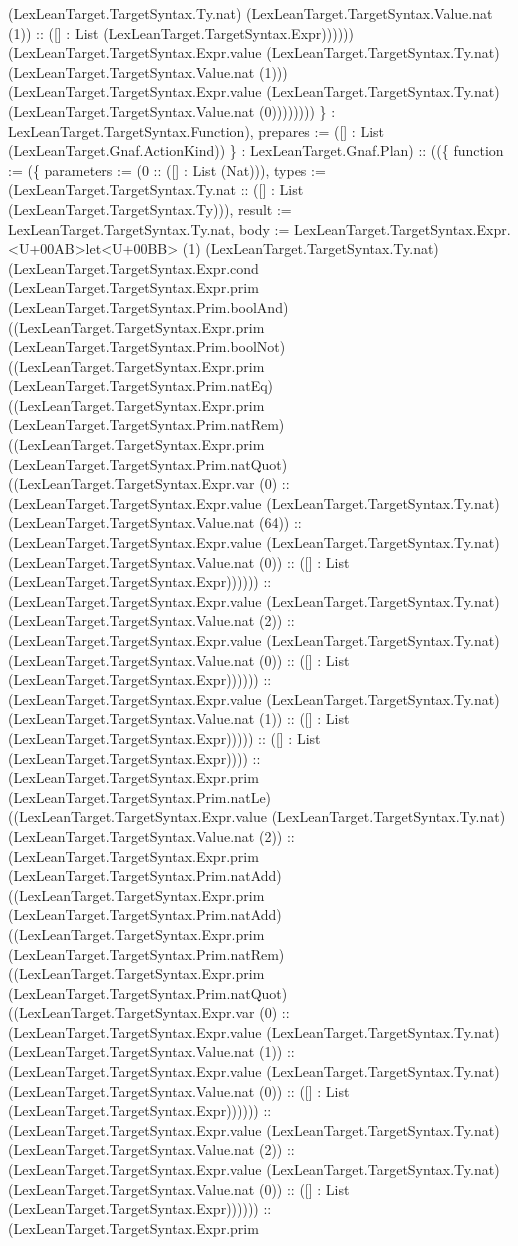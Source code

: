 \documentclass[11pt]{article}
\begin{document}
(LexLeanTarget.TargetSyntax.Ty.nat) (LexLeanTarget.TargetSyntax.Value.nat (1)) :: ([] : List (LexLeanTarget.TargetSyntax.Expr)))))) (LexLeanTarget.TargetSyntax.Expr.value (LexLeanTarget.TargetSyntax.Ty.nat) (LexLeanTarget.TargetSyntax.Value.nat (1))) (LexLeanTarget.TargetSyntax.Expr.value (LexLeanTarget.TargetSyntax.Ty.nat) (LexLeanTarget.TargetSyntax.Value.nat (0)))))))) \} : LexLeanTarget.TargetSyntax.Function), prepares := ([] : List (LexLeanTarget.Gnaf.ActionKind)) \} : LexLeanTarget.Gnaf.Plan) :: ((\{ function := (\{ parameters := (0 :: ([] : List (Nat))), types := (LexLeanTarget.TargetSyntax.Ty.nat :: ([] : List (LexLeanTarget.TargetSyntax.Ty))), result := LexLeanTarget.TargetSyntax.Ty.nat, body := LexLeanTarget.TargetSyntax.Expr.<U+00AB>let<U+00BB> (1) (LexLeanTarget.TargetSyntax.Ty.nat) (LexLeanTarget.TargetSyntax.Expr.cond (LexLeanTarget.TargetSyntax.Expr.prim (LexLeanTarget.TargetSyntax.Prim.boolAnd) ((LexLeanTarget.TargetSyntax.Expr.prim (LexLeanTarget.TargetSyntax.Prim.boolNot) ((LexLeanTarget.TargetSyntax.Expr.prim (LexLeanTarget.TargetSyntax.Prim.natEq) ((LexLeanTarget.TargetSyntax.Expr.prim (LexLeanTarget.TargetSyntax.Prim.natRem) ((LexLeanTarget.TargetSyntax.Expr.prim (LexLeanTarget.TargetSyntax.Prim.natQuot) ((LexLeanTarget.TargetSyntax.Expr.var (0) :: (LexLeanTarget.TargetSyntax.Expr.value (LexLeanTarget.TargetSyntax.Ty.nat) (LexLeanTarget.TargetSyntax.Value.nat (64)) :: (LexLeanTarget.TargetSyntax.Expr.value (LexLeanTarget.TargetSyntax.Ty.nat) (LexLeanTarget.TargetSyntax.Value.nat (0)) :: ([] : List (LexLeanTarget.TargetSyntax.Expr)))))) :: (LexLeanTarget.TargetSyntax.Expr.value (LexLeanTarget.TargetSyntax.Ty.nat) (LexLeanTarget.TargetSyntax.Value.nat (2)) :: (LexLeanTarget.TargetSyntax.Expr.value (LexLeanTarget.TargetSyntax.Ty.nat) (LexLeanTarget.TargetSyntax.Value.nat (0)) :: ([] : List (LexLeanTarget.TargetSyntax.Expr)))))) :: (LexLeanTarget.TargetSyntax.Expr.value (LexLeanTarget.TargetSyntax.Ty.nat) (LexLeanTarget.TargetSyntax.Value.nat (1)) :: ([] : List (LexLeanTarget.TargetSyntax.Expr))))) :: ([] : List (LexLeanTarget.TargetSyntax.Expr)))) :: (LexLeanTarget.TargetSyntax.Expr.prim (LexLeanTarget.TargetSyntax.Prim.natLe) ((LexLeanTarget.TargetSyntax.Expr.value (LexLeanTarget.TargetSyntax.Ty.nat) (LexLeanTarget.TargetSyntax.Value.nat (2)) :: (LexLeanTarget.TargetSyntax.Expr.prim (LexLeanTarget.TargetSyntax.Prim.natAdd) ((LexLeanTarget.TargetSyntax.Expr.prim (LexLeanTarget.TargetSyntax.Prim.natAdd) ((LexLeanTarget.TargetSyntax.Expr.prim (LexLeanTarget.TargetSyntax.Prim.natRem) ((LexLeanTarget.TargetSyntax.Expr.prim (LexLeanTarget.TargetSyntax.Prim.natQuot) ((LexLeanTarget.TargetSyntax.Expr.var (0) :: (LexLeanTarget.TargetSyntax.Expr.value (LexLeanTarget.TargetSyntax.Ty.nat) (LexLeanTarget.TargetSyntax.Value.nat (1)) :: (LexLeanTarget.TargetSyntax.Expr.value (LexLeanTarget.TargetSyntax.Ty.nat) (LexLeanTarget.TargetSyntax.Value.nat (0)) :: ([] : List (LexLeanTarget.TargetSyntax.Expr)))))) :: (LexLeanTarget.TargetSyntax.Expr.value (LexLeanTarget.TargetSyntax.Ty.nat) (LexLeanTarget.TargetSyntax.Value.nat (2)) :: (LexLeanTarget.TargetSyntax.Expr.value (LexLeanTarget.TargetSyntax.Ty.nat) (LexLeanTarget.TargetSyntax.Value.nat (0)) :: ([] : List (LexLeanTarget.TargetSyntax.Expr)))))) :: (LexLeanTarget.TargetSyntax.Expr.prim 
\end{document}
